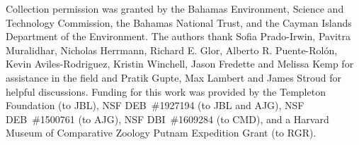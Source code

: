Collection permission was granted by the Bahamas Environment, Science and Technology Commission, the Bahamas National Trust, and the Cayman Islands Department of the Environment. The authors thank Sofia Prado-Irwin, Pavitra Muralidhar, Nicholas Herrmann, Richard E. Glor, Alberto R. Puente-Rol\'{o}n, Kevin Aviles-Rodriguez, Kristin Winchell, Jason Fredette and Melissa Kemp for assistance in the field and Pratik Gupte, Max Lambert and James Stroud for helpful discussions. Funding for this work was provided by the Templeton Foundation (to JBL), NSF DEB~\#1927194 (to JBL and AJG), NSF DEB~\#1500761 (to AJG), NSF DBI~\#1609284 (to CMD), and a Harvard Museum of Comparative Zoology Putnam Expedition Grant (to RGR).